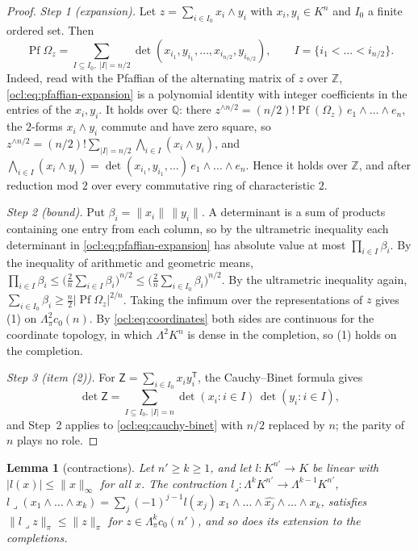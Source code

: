 \documentclass[11pt]{amsart}
\newtheorem{lemma}[theorem]{Lemma}
\theoremstyle{definition}
\theoremstyle{remark}
\numberwithin{equation}{section}
\newcommand{\abs}[1]{\lvert #1\rvert}
\newcommand{\norm}[1]{\lVert #1\rVert}
\theoremstyle{plain}
\theoremstyle{definition}
\theoremstyle{plain}
\begin{document}
\begin{proof}
\emph{Step 1 (expansion).} Let $z=\sum_{i\in I_0}x_i\wedge y_i$ with $x_i,y_i\in K^n$ and $I_0$ a finite ordered set.
Then
\begin{equation}\label{ocl:eq:pfaffian-expansion}
\operatorname{Pf}\Omega_z=\sum_{I\subseteq I_0,\ \abs I=n/2}\det(x_{i_1},y_{i_1},\dots,x_{i_{n/2}},y_{i_{n/2}}),
\qquad I=\{i_1<\dots<i_{n/2}\}.
\end{equation}
Indeed, read with the Pfaffian of the alternating matrix of $z$ over $\mathbb Z$, \eqref{ocl:eq:pfaffian-expansion} is
a polynomial identity with integer coefficients in the entries of the $x_i,y_i$. It holds over $\mathbb Q$: there
$z^{\wedge n/2}=(n/2)!\operatorname{Pf}(\Omega_z)\,e_1\wedge\dots\wedge e_n$, the $2$-forms $x_i\wedge y_i$ commute and
have zero square, so $z^{\wedge n/2}=(n/2)!\sum_{\abs I=n/2}\bigwedge_{i\in I}(x_i\wedge y_i)$, and
$\bigwedge_{i\in I}(x_i\wedge y_i)=\det(x_{i_1},y_{i_1},\dots)\,e_1\wedge\dots\wedge e_n$. Hence it holds over
$\mathbb Z$, and after reduction mod $2$ over every commutative ring of characteristic $2$.

\emph{Step 2 (bound).} Put $\beta_i=\norm{x_i}\,\norm{y_i}$. A determinant is a sum of products containing one entry from each
column, so by the ultrametric inequality each determinant in \eqref{ocl:eq:pfaffian-expansion} has absolute value at
most $\prod_{i\in I}\beta_i$. By the inequality of arithmetic and geometric means,
$\prod_{i\in I}\beta_i\le\bigl(\frac2n\sum_{i\in I}\beta_i\bigr)^{n/2}\le\bigl(\frac2n\sum_{i\in I_0}\beta_i\bigr)^{n/2}$.
By the ultrametric inequality again, $\sum_{i\in I_0}\beta_i\ge\frac n2\abs{\operatorname{Pf}\Omega_z}^{2/n}$. Taking the
infimum over the representations of $z$ gives (1) on $\Lambda^2_\pi c_0(n)$. By \eqref{ocl:eq:coordinates} both
sides are continuous for the coordinate topology, in which $\Lambda^2K^n$ is dense in the completion, so (1) holds on
the completion.

\emph{Step 3 (item (2)).} For $\mathsf Z=\sum_{i\in I_0}x_iy_i^{\mathsf T}$, the Cauchy--Binet formula gives
\begin{equation}\label{ocl:eq:cauchy-binet}
\det\mathsf Z=\sum_{I\subseteq I_0,\ \abs I=n}\det(x_i:i\in I)\,\det(y_i:i\in I),
\end{equation}
and Step~2 applies to \eqref{ocl:eq:cauchy-binet} with $n/2$ replaced by $n$; the parity of $n$ plays no role.
\end{proof}

\begin{lemma}[contractions]\label{ocl:lem:contraction}
Let $n'\ge k\ge1$, and let $l\colon K^{n'}\to K$ be linear with $\abs{l(x)}\le\norm x_\infty$ for all $x$. The contraction
$l\mathbin{\lrcorner}\colon\Lambda^kK^{n'}\to\Lambda^{k-1}K^{n'}$,
$l\mathbin{\lrcorner}(x_1\wedge\dots\wedge x_k)=\sum_j(-1)^{j-1}l(x_j)\,x_1\wedge\dots\wedge\widehat{x_j}\wedge\dots\wedge x_k$,
satisfies $\norm{l\mathbin{\lrcorner} z}_\pi\le\norm z_\pi$ for $z\in\Lambda^k_\pi c_0(n')$, and so does its extension to the
completions.
\end{lemma}
\end{document}
